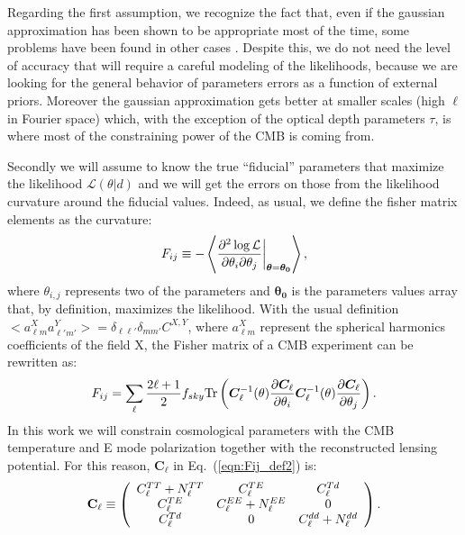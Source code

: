 \documentclass[aps,prd,reprint,superscriptaddress]{revtex4-1}
\newcommand\refeq[1]{Eq.~(\ref{eqn:#1})}
\begin{document}
Regarding the first assumption, we recognize the fact that, even if the gaussian approximation has been shown to be appropriate most of the time, some problems have been found in other cases \cite{2012JCAP...09..009W}. Despite this, we do not need the level of accuracy that will require a careful modeling of the likelihoods, because we are looking for the general behavior of parameters errors as a function of external priors.
Moreover the gaussian approximation gets better at smaller scales (high $\ell$ in Fourier space) which, with the exception of the optical depth parameters $\tau$, is where most of the constraining power of the CMB is coming from.

 
Secondly we will assume to know the true ``fiducial'' parameters that maximize the likelihood $\mathcal{L}(\theta|d)$ and we will get the errors on those from the likelihood curvature around the fiducial values.
Indeed, as usual, we define the fisher matrix elements as the curvature:
\begin{equation}
	\centering
		F_{ij} \equiv - \left\langle\frac{\partial^2 \log \mathcal{L}}{\partial \theta_i \partial \theta_j} \bigg|_{\boldsymbol{\theta} = \boldsymbol{\theta_0}}\right\rangle,
	\label{eqn:Fij_def}
\end{equation}
where $\theta_{i,j}$ represents two of the parameters and $\boldsymbol{\theta_0}$ is the parameters values array that, by definition, maximizes the likelihood.
 With the usual definition \cite{} $<a_{\ell m}^{X}a_{\ell' m'}^{Y}>=\delta_{\ell \ell'}\delta_{mm'}C^{X,Y}$, where $a_{\ell m}^{X}$ represent the spherical harmonics coefficients of the field X, the Fisher matrix of a CMB experiment can be rewritten as:
\begin{equation}
 F_{ij} = \sum_\ell \frac{2\ell+1}{2} f_{sky} {\rm Tr} \left(  \boldsymbol{C}^{-1}_\ell( \theta) \frac{\partial \boldsymbol{C}_\ell}{\partial \theta_i} \boldsymbol{C}^{-1}_\ell( \theta) \frac{\partial \boldsymbol{C}_\ell}{\partial \theta_j}  \right).
 \label{eqn:Fij_def2}
 \end{equation}
 In this work we will constrain cosmological parameters with the CMB temperature and E mode polarization together with the reconstructed lensing potential. For this reason, $\boldsymbol{C}_\ell$ in \refeq{Fij_def2} is:
 \begin{eqnarray}
 	\centering
		\mathbf{C}_\ell \equiv \left( \begin{array}{ccc}C_\ell^{TT} + N_\ell^{TT} & C_\ell^{TE} & C_\ell^{Td} \\ C_\ell^{TE} & C_\ell^{EE} + N_\ell^{EE} & 0 \\ C_\ell^{Td} & 0 & C_\ell^{dd} + N_\ell^{dd}\end{array}\right).
	\label{eqn:cov_definition}
\end{eqnarray}
\end{document}
